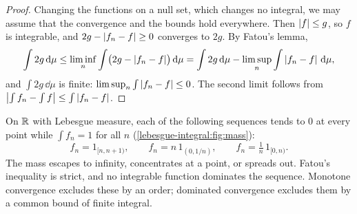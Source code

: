 \begin{notechapter}
\begin{proof}
Changing the functions on a null set, which changes no integral, we may
assume that the convergence and the bounds hold everywhere. Then
$\left|f\right|\leq g$, so $f$ is integrable, and
$2g - \left|f_n - f\right|\geq0$ converges to $2g$. By Fatou's lemma,
\[
  \int2g\,\mathrm{d}\mu
  \leq\liminf_n\int\bigl(2g - \left|f_n - f\right|\bigr)\,\mathrm{d}\mu
  = \int2g\,\mathrm{d}\mu - \limsup_n\int\left|f_n - f\right|\,\mathrm{d}\mu ,
\]
and $\int2g\,\dd\mu$ is finite: $\limsup_n\int\left|f_n - f\right| \leq0$. The
second limit follows from
$\left|\int f_n - \int f\right|\leq\int\left|f_n - f\right|$.
\end{proof}

\begin{pitfall}
On $\mathbb{R}$ with Lebesgue measure, each of the following sequences tends to
$0$ at every point while $\int f_n = 1$ for all $n$
(\cref{lebesgue-integral:fig:mass}):
\[
  f_n = 1_{[n, n+1)} , \qquad
  f_n = n\,1_{(0, 1/n)} , \qquad
  f_n = \tfrac1n\,1_{[0, n)} .
\]
The mass escapes to infinity, concentrates at a point, or spreads out.
Fatou's inequality is strict, and no integrable function dominates the
sequence. Monotone convergence excludes these by an order; dominated
convergence excludes them by a common bound of finite integral.
\end{pitfall}


\end{notechapter}
